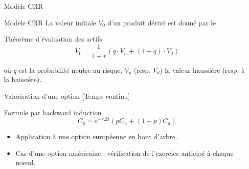 \documentclass[11pt]{beamer}
\begin{document}
\begin{frame}{Modèle CRR}
\begin{center}
\end{center}
\end{frame}

\begin{frame}{Modèle CRR}
La valeur initiale \(V_0\) d'un produit dérivé est donné par le 
\begin{block}{Théorème d'évaluation des actifs}
    \[V_0 = \frac{1}{1 + r} \left( q \cdot V_u + (1 - q) \cdot V_d \right)\]
\end{block}
où \( q \) est la probabilité neutre au risque, \( V_u \) (resp. \(V_d\)) la valeur haussière (resp. à la baissière).

\end{frame}


\begin{frame}{Valorisation d'une option}
[Temps continu]
\begin{block}{Formule par backward induction}
\[
C_0 = e^{-r\Delta t} \left( p C_u + (1 - p) C_d \right)
\]
\end{block}

\begin{itemize}
    \item Application à une option européenne en bout d’arbre.
    \item Cas d’une option américaine : vérification de l’exercice anticipé à chaque noeud.
\end{itemize}
\end{frame}
\end{document}
